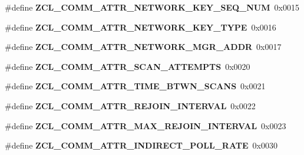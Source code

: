 \begin{DoxyCompactItemize}
\item 
\mbox{\label{group__zcl__commissioning_ga46aa2ae4df74769780e5fdcb9024ae1a}} 
\#define {\bfseries Z\+C\+L\+\_\+\+C\+O\+M\+M\+\_\+\+A\+T\+T\+R\+\_\+\+N\+E\+T\+W\+O\+R\+K\+\_\+\+K\+E\+Y\+\_\+\+S\+E\+Q\+\_\+\+N\+UM}~0x0015
\item 
\mbox{\label{group__zcl__commissioning_ga2a0adae89092d9dc34bfcffb04b63a6a}} 
\#define {\bfseries Z\+C\+L\+\_\+\+C\+O\+M\+M\+\_\+\+A\+T\+T\+R\+\_\+\+N\+E\+T\+W\+O\+R\+K\+\_\+\+K\+E\+Y\+\_\+\+T\+Y\+PE}~0x0016
\item 
\mbox{\label{group__zcl__commissioning_ga0230f3f6ddeb8d847ec5595bb988ed67}} 
\#define {\bfseries Z\+C\+L\+\_\+\+C\+O\+M\+M\+\_\+\+A\+T\+T\+R\+\_\+\+N\+E\+T\+W\+O\+R\+K\+\_\+\+M\+G\+R\+\_\+\+A\+D\+DR}~0x0017
\item 
\mbox{\label{group__zcl__commissioning_ga0337c6309978b8f91597fd5e61e887ed}} 
\#define {\bfseries Z\+C\+L\+\_\+\+C\+O\+M\+M\+\_\+\+A\+T\+T\+R\+\_\+\+S\+C\+A\+N\+\_\+\+A\+T\+T\+E\+M\+P\+TS}~0x0020
\item 
\mbox{\label{group__zcl__commissioning_ga3eddf67a9cc62af2c22cd24f659f1b18}} 
\#define {\bfseries Z\+C\+L\+\_\+\+C\+O\+M\+M\+\_\+\+A\+T\+T\+R\+\_\+\+T\+I\+M\+E\+\_\+\+B\+T\+W\+N\+\_\+\+S\+C\+A\+NS}~0x0021
\item 
\mbox{\label{group__zcl__commissioning_ga9e0d16cb6839223fe1dca2a1d3703c7b}} 
\#define {\bfseries Z\+C\+L\+\_\+\+C\+O\+M\+M\+\_\+\+A\+T\+T\+R\+\_\+\+R\+E\+J\+O\+I\+N\+\_\+\+I\+N\+T\+E\+R\+V\+AL}~0x0022
\item 
\mbox{\label{group__zcl__commissioning_gab193b58cf6028a80b575eb9037d5bc38}} 
\#define {\bfseries Z\+C\+L\+\_\+\+C\+O\+M\+M\+\_\+\+A\+T\+T\+R\+\_\+\+M\+A\+X\+\_\+\+R\+E\+J\+O\+I\+N\+\_\+\+I\+N\+T\+E\+R\+V\+AL}~0x0023
\item 
\mbox{\label{group__zcl__commissioning_gaf6b67081eaae4edd85f9293536b90469}} 
\#define {\bfseries Z\+C\+L\+\_\+\+C\+O\+M\+M\+\_\+\+A\+T\+T\+R\+\_\+\+I\+N\+D\+I\+R\+E\+C\+T\+\_\+\+P\+O\+L\+L\+\_\+\+R\+A\+TE}~0x0030

\end{DoxyCompactItemize}
